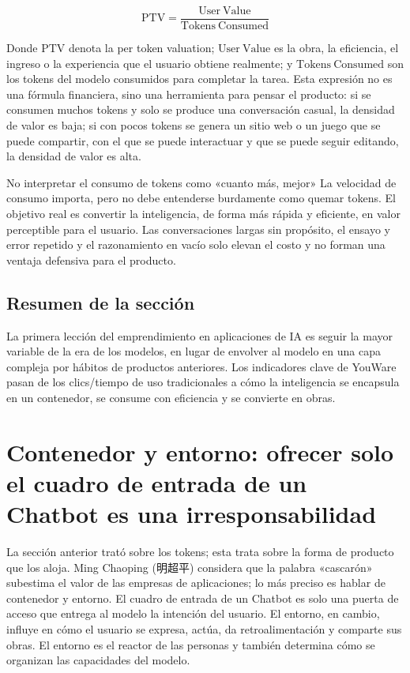 \documentclass[a4paper]{article}
\begin{document}
\[
\mathrm{PTV}=\frac{\mathrm{User\ Value}}{\mathrm{Tokens\ Consumed}}
\]

Donde $\mathrm{PTV}$ denota la per token valuation; $\mathrm{User\ Value}$ es la obra, la eficiencia, el ingreso o la experiencia que el usuario obtiene realmente; y $\mathrm{Tokens\ Consumed}$ son los tokens del modelo consumidos para completar la tarea. Esta expresión no es una fórmula financiera, sino una herramienta para pensar el producto: si se consumen muchos tokens y solo se produce una conversación casual, la densidad de valor es baja; si con pocos tokens se genera un sitio web o un juego que se puede compartir, con el que se puede interactuar y que se puede seguir editando, la densidad de valor es alta.

\begin{warningbox}{No interpretar el consumo de tokens como «cuanto más, mejor»}
La velocidad de consumo importa, pero no debe entenderse burdamente como quemar tokens. El objetivo real es convertir la inteligencia, de forma más rápida y eficiente, en valor perceptible para el usuario. Las conversaciones largas sin propósito, el ensayo y error repetido y el razonamiento en vacío solo elevan el costo y no forman una ventaja defensiva para el producto.
\end{warningbox}

\subsection{Resumen de la sección}

La primera lección del emprendimiento en aplicaciones de IA es seguir la mayor variable de la era de los modelos, en lugar de envolver al modelo en una capa compleja por hábitos de productos anteriores. Los indicadores clave de YouWare pasan de los clics/tiempo de uso tradicionales a cómo la inteligencia se encapsula en un contenedor, se consume con eficiencia y se convierte en obras.
\section{Contenedor y entorno: ofrecer solo el cuadro de entrada de un Chatbot es una irresponsabilidad}

La sección anterior trató sobre los tokens; esta trata sobre la forma de producto que los aloja. Ming Chaoping (明超平) considera que la palabra «cascarón» subestima el valor de las empresas de aplicaciones; lo más preciso es hablar de contenedor y entorno. El cuadro de entrada de un Chatbot es solo una puerta de acceso que entrega al modelo la intención del usuario. El entorno, en cambio, influye en cómo el usuario se expresa, actúa, da retroalimentación y comparte sus obras. El entorno es el reactor de las personas y también determina cómo se organizan las capacidades del modelo.
\end{document}
